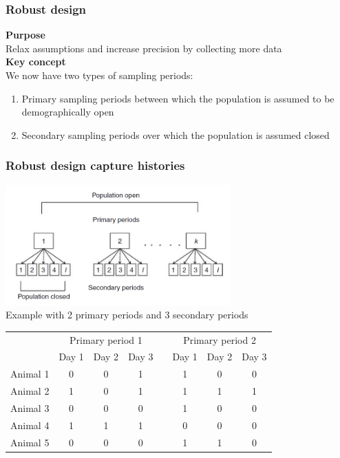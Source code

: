 \documentclass[color=usenames,dvipsnames]{beamer}\usepackage[]{graphicx}\usepackage[]{color}
\begin{document}
\begin{frame}
  \frametitle{Robust design}
  {\bf Purpose} \\
  Relax assumptions and increase precision by collecting more data \\
  \pause
  \vspace{0.5cm}
  {\bf Key concept} \\
  We now have two types of sampling periods:
  \begin{enumerate}[<+- | visible@+->][\bf \color{PineGreen} (1)]
    \item \alert{Primary sampling periods} between which the population
      is assumed to be demographically open
    \item \alert{Secondary sampling periods} over which the population
      is assumed closed
  \end{enumerate}
\end{frame}


\begin{frame}
  \frametitle{Robust design capture histories}
  \centering %
    \includegraphics[width=0.65\textwidth]{figs/robustDesign} \\
  \vfill
  \pause
  Example with 2 primary periods and 3 secondary periods \\
  \small
    \begin{tabular}{lccccccc}
      \hline
      & \multicolumn{3}{c}{Primary period 1} & &
        \multicolumn{3}{c}{Primary period 2} \\
      \cline{2-4} \cline{6-8}
      & Day 1 & Day 2 & Day 3 & & Day 1 & Day 2 & Day 3 \\
      \hline
      Animal 1 & 0 & 0 & 1 & & 1 & 0 & 0 \\
      Animal 2 & 1 & 0 & 1 & & 1 & 1 & 1 \\
      Animal 3 & 0 & 0 & 0 & & 1 & 0 & 0 \\
      Animal 4 & 1 & 1 & 1 & & 0 & 0 & 0 \\
      Animal 5 & 0 & 0 & 0 & & 1 & 1 & 0 \\
      \hline
    \end{tabular}
\end{frame}
\end{document}

